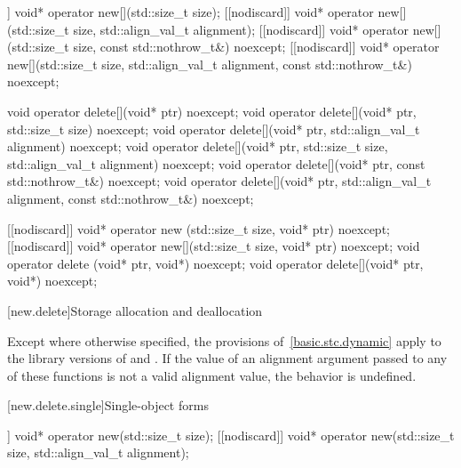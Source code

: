 \begin{codeblock}
[[nodiscard]] void* operator new[](std::size_t size);
[[nodiscard]] void* operator new[](std::size_t size, std::align_val_t alignment);
[[nodiscard]] void* operator new[](std::size_t size, const std::nothrow_t&) noexcept;
[[nodiscard]] void* operator new[](std::size_t size, std::align_val_t alignment,
                                   const std::nothrow_t&) noexcept;

void  operator delete[](void* ptr) noexcept;
void  operator delete[](void* ptr, std::size_t size) noexcept;
void  operator delete[](void* ptr, std::align_val_t alignment) noexcept;
void  operator delete[](void* ptr, std::size_t size, std::align_val_t alignment) noexcept;
void  operator delete[](void* ptr, const std::nothrow_t&) noexcept;
void  operator delete[](void* ptr, std::align_val_t alignment, const std::nothrow_t&) noexcept;

[[nodiscard]] void* operator new  (std::size_t size, void* ptr) noexcept;
[[nodiscard]] void* operator new[](std::size_t size, void* ptr) noexcept;
void  operator delete  (void* ptr, void*) noexcept;
void  operator delete[](void* ptr, void*) noexcept;
\end{codeblock}

[new.delete]{Storage allocation and deallocation}

\pnum
Except where otherwise specified, the provisions of~\ref{basic.stc.dynamic}
apply to the library versions of  and .
If the value of an alignment argument
passed to any of these functions
is not a valid alignment value,
the behavior is undefined.

\newcommand{\replaceabledesc}[1]{%
A \Cpp{} program may define functions with #1 of these function signatures,
and thereby displace the default versions defined by the
\Cpp{} standard library.%
}

[new.delete.single]{Single-object forms}

%
\begin{itemdecl}
[[nodiscard]] void* operator new(std::size_t size);
[[nodiscard]] void* operator new(std::size_t size, std::align_val_t alignment);
\end{itemdecl}

